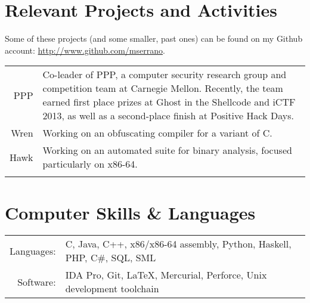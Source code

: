 \documentclass{article}
\begin{document}
\section{Relevant Projects and Activities}
Some of these projects (and some smaller, past ones)
can be found on my Github account: \url{http://www.github.com/mserrano}.

\begin{tabular}{r|p{}}
PPP & \footnotesize{Co-leader of PPP, a computer security research group and competition team at
Carnegie Mellon. Recently, the team earned first place prizes at Ghost in the Shellcode and iCTF
2013, as well as a second-place finish at Positive Hack Days.} \\
Wren & \footnotesize{Working on an obfuscating compiler for a variant of C.} \\
Hawk & \footnotesize{Working on an automated suite for binary analysis, focused particularly on
x86-64.} \\
\multicolumn{2}{c}{}\\
\end{tabular}

\section{Computer Skills \& Languages}
\begin{tabular}{rl}
Languages: & C, Java, C++, x86/x86-64 assembly, Python, Haskell, PHP, C\#, SQL, SML \\
Software: & IDA Pro, Git, \LaTeX, Mercurial, Perforce, Unix development toolchain \\
\end{tabular}
\end{document}
